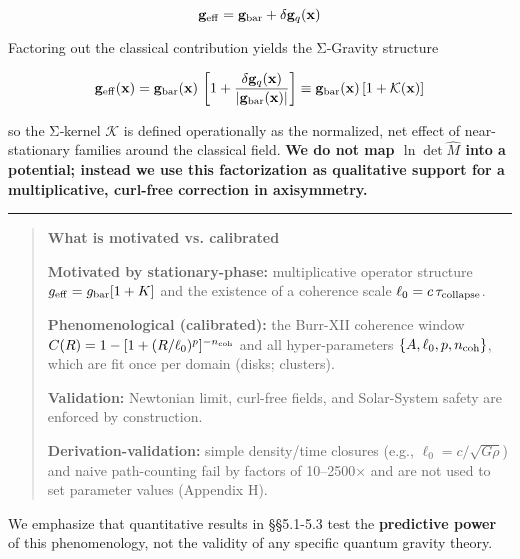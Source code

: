 \documentclass[11pt,a4paper]{article}
\begin{document}
\begin{equation}
\mathbf{g}_{\rm eff} = \mathbf{g}_{\rm bar} + \delta\mathbf{g}_q(\mathbf{x})
\end{equation}


Factoring out the classical contribution yields the Σ‑Gravity structure


\begin{equation}
\mathbf{g}_{\rm eff}(\mathbf{x}) = \mathbf{g}_{\rm bar}(\mathbf{x})\,\left[1 + \frac{\delta\mathbf{g}_q(\mathbf{x})}{\lvert\mathbf{g}_{\rm bar}(\mathbf{x})\rvert}\right] \equiv \mathbf{g}_{\rm bar}(\mathbf{x})\,[1+\mathcal{K}(\mathbf{x})]
\end{equation}


so the Σ‑kernel $\mathcal{K}$ is defined operationally as the normalized, net effect of near-stationary families around the classical field. \textbf{We do not map $\ln\det\hat{M}$ into a potential; instead we use this factorization as qualitative support for a multiplicative, curl-free correction in axisymmetry.}


\medskip\hrule\medskip


\begin{quote}
\textbf{What is motivated vs. calibrated}



\textbf{Motivated by stationary-phase:} multiplicative operator structure $g_{\rm eff}=g_{\rm bar}[1+K]$ and the existence of a coherence scale $\ell_0=c\,\tau_{\rm collapse}$.



\textbf{Phenomenological (calibrated):} the Burr-XII coherence window $C(R)=1-[1+(R/\ell_0)^p]^{-n_{\rm coh}}$ and all hyper-parameters $\{A,\ell_0,p,n_{\rm coh}\}$, which are fit once per domain (disks; clusters).



\textbf{Validation:} Newtonian limit, curl-free fields, and Solar-System safety are enforced by construction.



\textbf{Derivation-validation:} simple density/time closures (e.g., $\ell_0=c/\sqrt{G\rho}$) and naive path-counting fail by factors of 10–2500× and are not used to set parameter values (Appendix H).

\end{quote}


We emphasize that quantitative results in §§5.1-5.3 test the \textbf{predictive power} of this phenomenology, not the validity of any specific quantum gravity theory.
\end{document}
